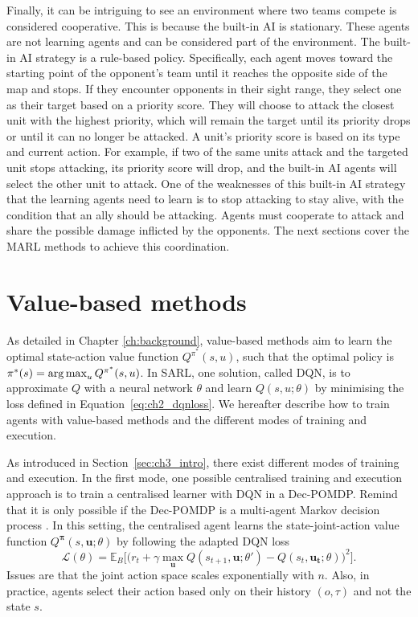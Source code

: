 Finally, it can be intriguing to see an environment where two teams compete is considered cooperative.
This is because the built-in AI is stationary. 
These agents are not learning agents and can be considered part of the environment.
The built-in AI strategy is a rule-based policy.
Specifically, each agent moves toward the starting point of the opponent's team until it reaches the opposite side of the map and stops.
If they encounter opponents in their sight range, they select one as their target based on a priority score.
They will choose to attack the closest unit with the highest priority, which will remain the target until its priority drops or until it can no longer be attacked.
A unit's priority score is based on its type and current action.
For example, if two of the same units attack and the targeted unit stops attacking, its priority score will drop, and the built-in AI agents will select the other unit to attack.
One of the weaknesses of this built-in AI strategy that the learning agents need to learn is to stop attacking to stay alive, with the condition that an ally should be attacking.
Agents must cooperate to attack and share the possible damage inflicted by the opponents.
The next sections cover the MARL methods to achieve this coordination.

\section{Value-based methods}
\label{sec:ch3_value}

As detailed in Chapter \ref{ch:background}, value-based methods aim to learn the optimal state-action value function $Q^{\pi^*}(s, u)$, such that the optimal policy is $\pi^*(s)=\operatorname*{arg\,max}_{u} Q^{\pi^*}(s, u)$.
In SARL, one solution, called DQN, is to approximate $Q$ with a neural network $\theta$ and learn $Q(s, u;\theta)$
by minimising the loss defined in Equation~\ref{eq:ch2_dqnloss}.
We hereafter describe how to train agents with value-based methods and the different modes of training and execution.

As introduced in Section~\ref{sec:ch3_intro}, there exist different modes of training and execution.
In the first mode, one possible centralised training and execution approach is to train a centralised learner with DQN in a Dec-POMDP.
Remind that it is only possible if the Dec-POMDP is a multi-agent Markov decision process \citep{boutilier1996planning}.
In this setting, the centralised agent learns the state-joint-action value function $Q^{\mathbf{\pi}}(s,\mathbf{u}; \theta)$ by following the adapted DQN loss
\begin{equation}
\label{eq:ch3_centralQloss}
    \mathcal{L}(\theta) = \mathbb{E}_{B} \big[\big(r_{t} + \gamma \max_{\mathbf{u}} Q(s_{t+1}, \mathbf{u}; \theta')- Q(s_{t}, \mathbf{\mathbf{u_t}}; \theta)\big)^{2}\big].
\end{equation}
Issues are that the joint action space scales exponentially with $n$.
Also, in practice, agents select their action based only on their history $(o, \tau)$ and not the state $s$.

